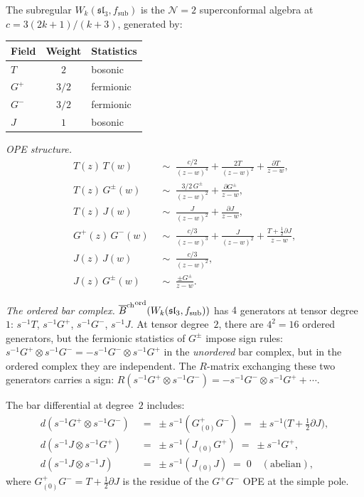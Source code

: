 \begin{conjecture}[Ordered bar complex for the
$\mathcal N=2$ superconformal algebra;
\ClaimStatusConjectured]
The subregular $W_k(\mathfrak{sl}_3,f_{\mathrm{sub}})$ is the
$\mathcal N=2$ superconformal algebra at
$c=3(2k+1)/(k+3)$, generated by:
\begin{center}
\renewcommand{\arraystretch}{1.15}
\begin{tabular}{lcl}
\textbf{Field} & \textbf{Weight} & \textbf{Statistics} \\
\hline
$T$ & $2$ & bosonic \\
$G^+$ & $3/2$ & fermionic \\
$G^-$ & $3/2$ & fermionic \\
$J$ & $1$ & bosonic
\end{tabular}
\end{center}

\emph{OPE structure.}
\begin{align*}
T(z)\,T(w)&\;\sim\;\frac{c/2}{(z{-}w)^4}
+\frac{2T}{(z{-}w)^2}+\frac{\partial T}{z{-}w},\\
T(z)\,G^\pm(w)&\;\sim\;\frac{3/2\,G^\pm}{(z{-}w)^2}
+\frac{\partial G^\pm}{z{-}w},\\
T(z)\,J(w)&\;\sim\;\frac{J}{(z{-}w)^2}
+\frac{\partial J}{z{-}w},\\
G^+(z)\,G^-(w)&\;\sim\;\frac{c/3}{(z{-}w)^3}
+\frac{J}{(z{-}w)^2}
+\frac{T+\frac12\partial J}{z{-}w},\\
J(z)\,J(w)&\;\sim\;\frac{c/3}{(z{-}w)^2},\\
J(z)\,G^\pm(w)&\;\sim\;\frac{\pm G^\pm}{z{-}w}.
\end{align*}

\emph{The ordered bar complex.}
${\overline{B}^{\mathrm{ch}}}^{\mathrm{ord}}(W_k(\mathfrak{sl}_3,f_{\mathrm{sub}}))$
has $4$ generators at tensor degree~$1$:
$s^{-1}T$, $s^{-1}G^+$, $s^{-1}G^-$, $s^{-1}J$.
At tensor degree~$2$, there are $4^2=16$ ordered generators,
but the fermionic statistics of $G^\pm$ impose sign rules:
$s^{-1}G^+\otimes s^{-1}G^-=-s^{-1}G^-\otimes s^{-1}G^+$
in the \emph{unordered} bar complex, but in the ordered
complex they are independent. The $R$-matrix exchanging
these two generators carries a sign:
$R(s^{-1}G^+\otimes s^{-1}G^-)
=-s^{-1}G^-\otimes s^{-1}G^++\cdots$.

The bar differential at degree~$2$ includes:
\begin{align*}
d(s^{-1}G^+\otimes s^{-1}G^-)
&\;=\;\pm s^{-1}(G^+_{(0)}G^-)
\;=\;\pm s^{-1}\bigl(T+\tfrac12\partial J\bigr),\\
d(s^{-1}J\otimes s^{-1}G^+)
&\;=\;\pm s^{-1}(J_{(0)}G^+)
\;=\;\pm s^{-1}G^+,\\
d(s^{-1}J\otimes s^{-1}J)
&\;=\;\pm s^{-1}(J_{(0)}J)\;=\;0
\quad(\text{abelian}),
\end{align*}
where $G^+_{(0)}G^-=T+\frac12\partial J$ is the residue of
the $G^+G^-$ OPE at the simple pole.


\end{conjecture}
